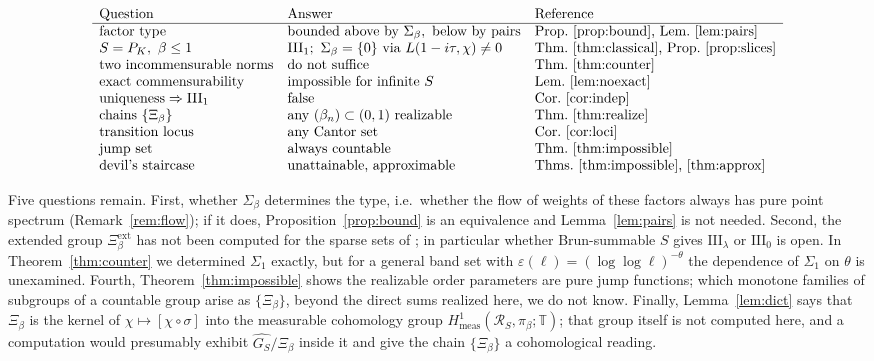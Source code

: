 \documentclass[11pt]{amsart}
\numberwithin{equation}{section}
\theoremstyle{definition}
\theoremstyle{remark}
\newcommand{\T}{\mathbb{T}}
\newcommand{\cR}{\mathcal{R}}
\newcommand{\Xiext}{\Xi^{\mathrm{ext}}_\beta}
\begin{document}
\[
\begin{array}{lll}
\text{Question} & \text{Answer} & \text{Reference}\\\hline
\text{factor type} & \text{bounded above by}\ \Sigma_\beta,\ \text{below by pairs} & \text{Prop.~\ref{prop:bound}, Lem.~\ref{lem:pairs}}\\
S=P_K,\ \beta\le1 & \mathrm{III}_1;\ \Sigma_\beta=\{0\}\ \text{via}\ L(1-i\tau,\chi)\ne0 & \text{Thm.~\ref{thm:classical}, Prop.~\ref{prop:slices}}\\
\text{two incommensurable norms} & \text{do not suffice} & \text{Thm.~\ref{thm:counter}}\\
\text{exact commensurability} & \text{impossible for infinite }S & \text{Lem.~\ref{lem:noexact}}\\
\text{uniqueness}\Rightarrow\mathrm{III}_1 & \text{false} & \text{Cor.~\ref{cor:indep}}\\
\text{chains}\ \{\Xi_\beta\} & \text{any}\ (\beta_n)\subset(0,1)\ \text{realizable} & \text{Thm.~\ref{thm:realize}}\\
\text{transition locus} & \text{any Cantor set} & \text{Cor.~\ref{cor:loci}}\\
\text{jump set} & \text{always countable} & \text{Thm.~\ref{thm:impossible}}\\
\text{devil's staircase} & \text{unattainable, approximable} & \text{Thms.~\ref{thm:impossible}, \ref{thm:approx}}
\end{array}
\]

Five questions remain. First, whether $\Sigma_\beta$ determines the type, i.e.\ whether the
flow of weights of these factors always has pure point spectrum (Remark~\ref{rem:flow}); if
it does, Proposition~\ref{prop:bound} is an equivalence and Lemma~\ref{lem:pairs} is not
needed. Second, the extended group $\Xiext$ has not been computed for the sparse sets
of \cite[\S5]{Main}; in particular whether Brun-summable $S$ gives $\mathrm{III}_\lambda$ or
$\mathrm{III}_0$ is open. In Theorem~\ref{thm:counter} we determined $\Sigma_1$ exactly, but
for a general band set with $\varepsilon(\ell)=(\log\log\ell)^{-\theta}$ the dependence of
$\Sigma_1$ on $\theta$ is unexamined. Fourth, Theorem~\ref{thm:impossible} shows the
realizable order parameters are pure jump functions; which monotone families of subgroups of
a countable group arise as $\{\Xi_\beta\}$, beyond the direct sums realized here, we do not
know. Finally, Lemma~\ref{lem:dict} says that $\Xi_\beta$ is the kernel of
$\chi\mapsto[\chi\circ\sigma]$ into the measurable cohomology group
$H^1_{\mathrm{meas}}(\cR_S,\pi_\beta;\T)$; that group itself is not computed here, and a
computation would presumably exhibit $\widehat{G_S}/\Xi_\beta$ inside it and give the chain
$\{\Xi_\beta\}$ a cohomological reading.
\end{document}
